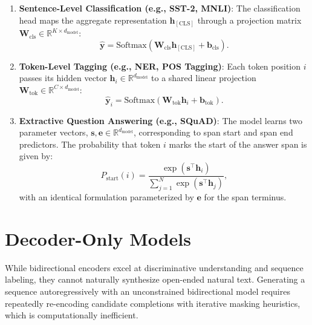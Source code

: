 \documentclass[../../main.tex]{subfiles}
\begin{document}
\begin{enumerate}
    \item \textbf{Sentence-Level Classification (e.g., SST-2, MNLI)}: The classification head maps the aggregate representation $\mathbf{h}_{[\text{CLS}]}$ through a projection matrix $\mathbf{W}_{\text{cls}} \in \mathbb{R}^{K \times d_{\text{model}}}$:
    \begin{equation}
    \hat{\mathbf{y}} = \text{Softmax}(\mathbf{W}_{\text{cls}} \mathbf{h}_{[\text{CLS}]} + \mathbf{b}_{\text{cls}}).
    \label{eq:bert_finetune_seq_classification}
    \end{equation}
    
    \item \textbf{Token-Level Tagging (e.g., NER, POS Tagging)}: Each token position $i$ passes its hidden vector $\mathbf{h}_i \in \mathbb{R}^{d_{\text{model}}}$ to a shared linear projection $\mathbf{W}_{\text{tok}} \in \mathbb{R}^{C \times d_{\text{model}}}$:
    \begin{equation}
    \hat{\mathbf{y}}_i = \text{Softmax}(\mathbf{W}_{\text{tok}} \mathbf{h}_i + \mathbf{b}_{\text{tok}}).
    \label{eq:bert_finetune_token_classification}
    \end{equation}
    
    \item \textbf{Extractive Question Answering (e.g., SQuAD)}: The model learns two parameter vectors, $\mathbf{s}, \mathbf{e} \in \mathbb{R}^{d_{\text{model}}}$, corresponding to span start and span end predictors. The probability that token $i$ marks the start of the answer span is given by:
    \begin{equation}
    P_{\text{start}}(i) = \frac{\exp(\mathbf{s}^\top \mathbf{h}_i)}{\sum_{j=1}^N \exp(\mathbf{s}^\top \mathbf{h}_j)},
    \label{eq:bert_squad_start_prob}
    \end{equation}
    with an identical formulation parameterized by $\mathbf{e}$ for the span terminus.
\end{enumerate}


\section{Decoder-Only Models}
\label{sec:decoder_only_models}

While bidirectional encoders excel at discriminative understanding and sequence labeling, they cannot naturally synthesize open-ended natural text. Generating a sequence autoregressively with an unconstrained bidirectional model requires repeatedly re-encoding candidate completions with iterative masking heuristics, which is computationally inefficient.
\end{document}
